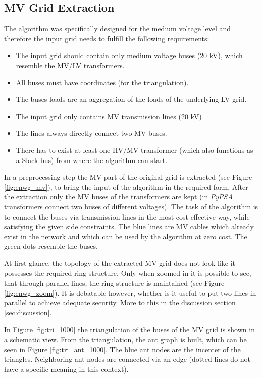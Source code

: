 \subsection{MV Grid Extraction}\label{sec:extraction}
The algorithm was specifically designed for the medium voltage level and therefore the input grid needs to fulfill the following requirements:
\begin{itemize}
	\setlength\itemsep{-1em}
	\item The input grid should contain only medium voltage buses (20 kV), which resemble the MV/LV transformers.
	\item All buses must have coordinates (for the triangulation).
	\item The buses loads are an aggregation of the loads of the underlying LV grid.
	\item The input grid only contains MV transmission lines (20 kV)
	\item The lines always directly connect two MV buses. 
	\item There has to exist at least one HV/MV transformer (which also functions as a Slack bus) from where the algorithm can start.
\end{itemize}



In a preprocessing step the MV part of the original grid is extracted (see Figure \ref{fig:enwg_mv}), to bring the input of the algorithm in the required form. After the extraction only the MV buses of the transformers are kept (in \textit{PyPSA} transformers connect two buses of different voltages). The task of the algorithm is to connect the buses via transmission lines in the most cost effective way, while satisfying the given side constraints. The blue lines are MV cables which already exist in the network and which can be used by the algorithm at zero cost. The green dots resemble the buses.


At first glance, the topology of the extracted MV grid does not look like it possesses the required ring structure. Only when zoomed in it is possible to see, that through parallel lines, the ring structure is maintained (see Figure \ref{fig:enwg_zoom}). It is debatable however, whether is it useful to put two lines in parallel to achieve adequate security. More to this in the discussion section \ref{sec:discussion}.


In Figure \ref{fig:tri_1000} the triangulation of the buses of the MV grid is shown in a schematic view. From the triangulation, the ant graph is built, which can be seen in Figure \ref{fig:tri_ant_1000}. The blue ant nodes are the incenter of the triangles. Neighboring ant nodes are connected via an edge (dotted lines do not have a specific meaning in this context).


